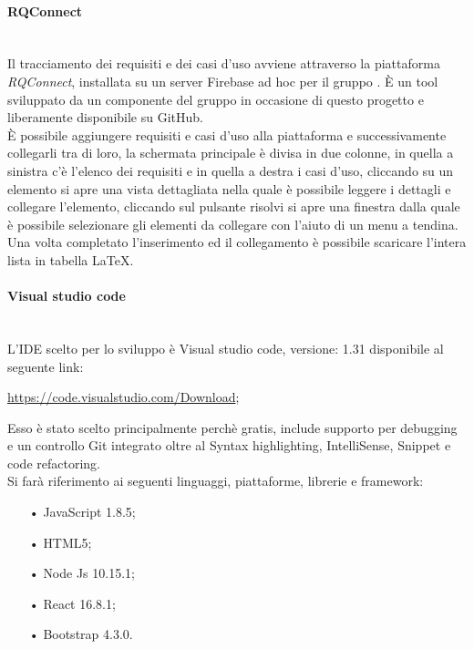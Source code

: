 \paragraph{RQConnect}\mbox{}\\ \label{sec:Trac}
Il tracciamento dei requisiti e dei casi d’uso avviene attraverso la piattaforma 
\textit{RQConnect}, installata su un server {Firebase} ad hoc per il gruppo \gruppo.
 È  un tool sviluppato da un componente del gruppo in occasione di questo progetto e 
 liberamente disponibile su GitHub.\\ È possibile aggiungere requisiti e casi d’uso 
 alla piattaforma e successivamente collegarli tra di loro, la schermata principale è 
 divisa in due colonne, in quella a sinistra c’è l’elenco dei requisiti e in quella a 
 destra i casi d’uso, cliccando su un elemento si apre una vista dettagliata nella quale 
 è possibile leggere i dettagli e collegare l’elemento, cliccando sul pulsante risolvi si 
 apre una finestra dalla quale è possibile selezionare gli elementi da collegare con l’aiuto 
 di un menu a tendina.\\Una volta completato l’inserimento ed il collegamento è possibile scaricare 
 l’intera lista in tabella \LaTeX.

\paragraph{Visual studio code}\mbox{}\\
L'{IDE} scelto per lo sviluppo è {Visual studio code}, versione: 1.31 disponibile al seguente link:\\
\begin{center}
	\url{https://code.visualstudio.com/Download};
\end{center}
Esso è stato scelto principalmente perchè gratis, include supporto per debugging e un controllo Git integrato oltre al {Syntax highlighting}, {IntelliSense}, {Snippet} e {code refactoring}.\\
Si farà riferimento ai seguenti linguaggi, piattaforme, librerie e framework:
\begin{itemize}
	\item[•]{JavaScript} 1.8.5;
	\item[•]{HTML5};
	\item[•]{Node Js} 10.15.1;
	\item[•]{React} 16.8.1;
	\item[•]{Bootstrap} 4.3.0.
\end{itemize}

